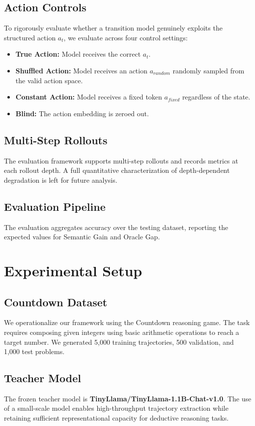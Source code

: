 \documentclass[conference]{IEEEtran}
\begin{document}
\subsection{Action Controls}
To rigorously evaluate whether a transition model genuinely exploits the structured action $a_t$, we evaluate across four control settings:
\begin{itemize}
    \item \textbf{True Action:} Model receives the correct $a_t$.
    \item \textbf{Shuffled Action:} Model receives an action $a_{random}$ randomly sampled from the valid action space.
    \item \textbf{Constant Action:} Model receives a fixed token $a_{fixed}$ regardless of the state.
    \item \textbf{Blind:} The action embedding is zeroed out.
\end{itemize}

\subsection{Multi-Step Rollouts}
The evaluation framework supports multi-step rollouts and records metrics at each rollout depth. A full quantitative characterization of depth-dependent degradation is left for future analysis.

\subsection{Evaluation Pipeline}
The evaluation aggregates accuracy over the testing dataset, reporting the expected values for Semantic Gain and Oracle Gap.

\section{Experimental Setup}

\subsection{Countdown Dataset}
We operationalize our framework using the Countdown reasoning game. The task requires composing given integers using basic arithmetic operations to reach a target number. We generated 5,000 training trajectories, 500 validation, and 1,000 test problems.

\subsection{Teacher Model}
The frozen teacher model is \textbf{TinyLlama/TinyLlama-1.1B-Chat-v1.0}. The use of a small-scale model enables high-throughput trajectory extraction while retaining sufficient representational capacity for deductive reasoning tasks. 
\end{document}
